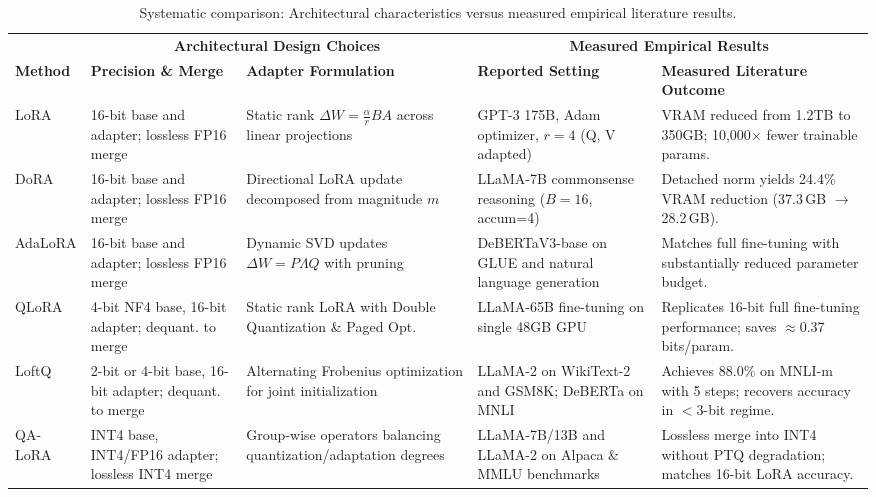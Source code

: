\documentclass[11pt,a4paper]{article}
\begin{document}
\begin{table}[ht]
\centering
\scriptsize
\caption{Systematic comparison: Architectural characteristics versus measured empirical literature results.}
\label{tab:comparison}
\begin{tabularx}{\textwidth}{lp{2.4cm}p{2.4cm}p{2.9cm}X}
\toprule
& \multicolumn{2}{c}{\textbf{Architectural Design Choices}} & \multicolumn{2}{c}{\textbf{Measured Empirical Results}} \\
\cmidrule(lr){2-3} \cmidrule(lr){4-5}
\textbf{Method} & \textbf{Precision \& Merge} & \textbf{Adapter Formulation} & \textbf{Reported Setting} & \textbf{Measured Literature Outcome} \\
\midrule
LoRA \cite{hu2021lora} & 16-bit base and adapter; lossless FP16 merge & Static rank $\Delta W = \frac{\alpha}{r}BA$ across linear projections & GPT-3 175B, Adam optimizer, $r=4$ (Q, V adapted) & VRAM reduced from 1.2TB to 350GB; 10,000$\times$ fewer trainable params. \\
DoRA \cite{liu2024dora} & 16-bit base and adapter; lossless FP16 merge & Directional LoRA update decomposed from magnitude $m$ & LLaMA-7B commonsense reasoning ($B=16$, accum=4) & Detached norm yields 24.4\% VRAM reduction (37.3\,GB $\to$ 28.2\,GB). \\
AdaLoRA \cite{zhang2023adalora} & 16-bit base and adapter; lossless FP16 merge & Dynamic SVD updates $\Delta W = P\Lambda Q$ with pruning & DeBERTaV3-base on GLUE and natural language generation & Matches full fine-tuning with substantially reduced parameter budget. \\
QLoRA \cite{dettmers2023qlora} & 4-bit NF4 base, 16-bit adapter; dequant. to merge & Static rank LoRA with Double Quantization \& Paged Opt. & LLaMA-65B fine-tuning on single 48GB GPU & Replicates 16-bit full fine-tuning performance; saves $\approx$0.37 bits/param. \\
LoftQ \cite{li2023loftq} & 2-bit or 4-bit base, 16-bit adapter; dequant. to merge & Alternating Frobenius optimization for joint initialization & LLaMA-2 on WikiText-2 and GSM8K; DeBERTa on MNLI & Achieves 88.0\% on MNLI-m with 5 steps; recovers accuracy in $<3$-bit regime. \\
QA-LoRA \cite{xu2023qa} & INT4 base, INT4/FP16 adapter; lossless INT4 merge & Group-wise operators balancing quantization/adaptation degrees & LLaMA-7B/13B and LLaMA-2 on Alpaca \& MMLU benchmarks & Lossless merge into INT4 without PTQ degradation; matches 16-bit LoRA accuracy. \\
\bottomrule
\end{tabularx}
\end{table}
\end{document}
